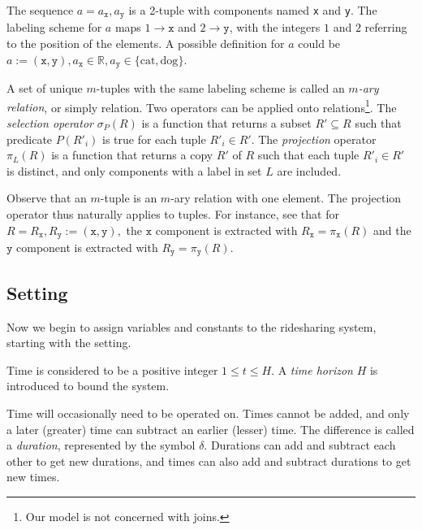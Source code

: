 \begin{example}
\label{ex:tuple}
The sequence $a=a_\texttt{x},a_\texttt{y}$
is a 2-tuple with components named \texttt{x} and \texttt{y}.
The labeling
scheme for $a$ maps $1\rightarrow \texttt{x}$ and $2\rightarrow \texttt{y}$, with the
integers $1$ and $2$ referring to the position of the elements. A possible definition for
$a$ could be $a:=(\texttt{x},\texttt{y}),
a_\texttt{x}\in\mathbb{R}, a_\texttt{y}\in\{\textrm{cat},\textrm{dog}\}.$
\end{example}

A set of unique $m$-tuples with the same labeling scheme is called
an \emph{$m$-ary relation}, or simply relation.
Two operators can be applied onto relations\footnote{Our model is not concerned with joins.}.
The \emph{selection operator} $\sigma_P(R)$ is a function that returns a subset
$R'\subseteq R$ such that predicate $P(R'_i)$ is true for each tuple $R'_i\in R'$.
The \emph{projection} operator $\pi_L(R)$ is a function that returns a copy
$R'$ of $R$ such that each tuple $R'_i\in R'$ is distinct, and only components
with a label in set $L$ are included.

Observe that an $m$-tuple is an $m$-ary relation with one element.
The projection operator thus naturally applies to tuples. For instance, see that for
$R=R_\texttt{x},R_\texttt{y}:=(\texttt{x},\texttt{y}),$
the $\texttt{x}$ component is extracted with
$R_\texttt{x}=\pi_\texttt{x}(R)$
and the $\texttt{y}$ component is extracted with
$R_\texttt{y}=\pi_\texttt{y}(R)$.

\subsection{Setting}
\label{ch:1:sec:setting}
Now we begin to assign variables and constants to the ridesharing
system, starting with the setting.

 Time is considered to be a positive integer $1\leq t\leq H$.  A
\emph{time horizon} $H$ is introduced to bound the system.

Time will occasionally need to be operated on.  Times cannot be added, and only
a later (greater) time can subtract an earlier (lesser) time.  The difference
is called a \emph{duration}, represented by the symbol $\delta$.  Durations can
add and subtract each other to get new durations, and times can also add and
subtract durations to get new times.

